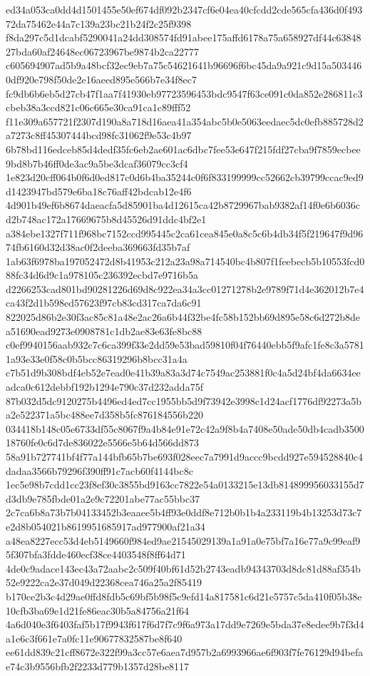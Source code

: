 \documentclass[11pt,a4paper]{article}
\begin{document}
{ed34a053ca0dd4d1501455e50ef674df092b2347cf6e04ea40cfcdd2cde565cfa436d0f49372da75462e44a7c139a23bc21b24f2c25f9398
f8da297c5d1dcabf5290041a24dd308574fd91abee175affd6178a75a658927df44c6384827bda60af24648ec06723967be9874b2ca22777
c605694907ad5b9a48bcf32ec9eb7a75c54621641b96696f6bc45da9a921c9d15a5034460df920e798f50de2e16aeed895e566b7e34f8ec7
fc9db6b6eb5d27cb47f1aa7f41930eb97723596453bdc9547f63ce091c0da852e286811c3cbeb38a3ccd821c06c665e30ca91ca1c89fff52
f11e309a657721f2307d190a8a718d16aea41a354abc5b0e5063eedaec5dc0efb885728d2a7273c8ff45307444bcd98fc31062f9e53c4b97
6b78bd116edceb85d4dedf35fc6eb2ae601ac6dbc7fee53e647f215fdf27cba9f7859ecbee9bd8b7b46ff0de3ac9a5be3dcaf36079cc3cf4
1e823d20cff064b0f6d0ed817c0d6b4ba35244c0f6f833199999cc52662cb39799ccac9ed9d1423947bd579e6ba18c76aff42bdcab12e4f6
4d901b49ef6b8674daeacfa5d85901ba4d12615ca42b8729967bab9382af14f0e6b6036cd2b748ac172a17669675b8d45526d91ddc4bf2e1
a384ebe1327f711f968bc7152ccd995445c2ca61cea845e0a8c5c6b4db34f5f219647f9d9674fb6160d32d38ac0f2deeba369663fd35b7af
1ab63f6978ba197052472d8b41953c212a23a98a714540bc4b807f1feebecb5b10553fcd088fc34d6d9c1a978105c236392ecbd7e9716b5a
d2266253cad801bd90281226d69d8c922ea34a3cc01271278b2e9789f71d4e362012b7e4ca43f2d1b598ed57623f97cb83cd317ca7da6c91
822025d86b2e30f3ac85c81a48e2ac26a6b44f32be4fc58b152bb69d895e58c6d272b8dea51690ead9273e0908781c1db2ae83e63fe8bc88
c0ef9940156aab932c7c6ca399f33e2dd59e53bad59810f04f76440ebb5f9afc1fe8c3a57811a93e33e0f58c0b5bcc86319296b8bcc31a4a
c7b51d9b308bdf4eb52e7ead0e41b39a83a3d74c7549ac253881f0c4a5d24bf4da6634eeadca0c612debbf192b1294e790c37d232adda75f
87b032d5dc9120275b4496ed4ed7cc1955bb5d9f73942e3998c1d24acf1776df92273a5ba2e522371a5bc488ee7d358b5fc876184556b220
034418b148c05e6733df55c8067f9a4b84e91e72c42a9f8b4a7408e50ade50db4cadb350018760fe0c6d7de836022e5566e5b64d566dd873
58a91b727741bf4f77a144bfb65b7be693f028eec7a7991d9accc9bcdd927e594528840c4dadaa3566b79296f390ff91c7acb60f4144bc8c
1ec5e98b7cdd1cc23f8ef30c3855bd9163cc7822e54a0133215e13db814899956033155d7d3db9e785fbde01a2e9c72201abe77ac55bbc37
2c7ca6b8a73b7b04133452b3eaaee5b4ff93e0ddf8e712b0b1b4a233119b4b13253d73c7e2d8b054021b8619951685917ad977900af21a34
a48ea8227ecc53d4eb5149660f984ed9ae21545029139a1a91a0e75bf7a16e77a9c99eaf95f307bfa3fdde460ecf38ce4403548f8ff64d71
4de0c9adace143ec43a72aabc2c509f40bf61d52b2743eadb94343703d8dc81d88af354b52e9222ca2e37d049d22368cea746a25a2f85419
b170ce2b3c4d29ae0ffd8fdb5c69bf5b98f5c9efd14a817581c6d21e5757c5da410f05b38e10cfb3ba69e1d21fe86eac30b5a84756a21f64
4a6d040e3f6403faf5b17f9943f617f6d7f7c9f6a973a17dd9e7269e5bda37e8edee9b7f3d4a1e6c3f661e7a0fc11e90677832587be8f640
ee61dd839c21cff8672e322f99a3cc57e6aea7d957b2a6993966ae6f903f7fe76129d94befae74c3b9556bfb2f2233d779b1357d28be8117
}
\end{document}
